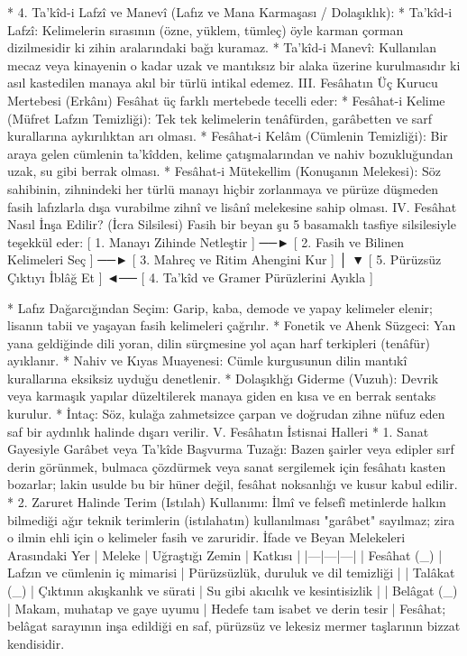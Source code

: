 \documentclass[11pt,a4paper]{article}
\begin{document}
 * 4. Ta'kîd-i Lafzî ve Manevî (Lafız ve Mana Karmaşası / Dolaşıklık):
   * Ta'kîd-i Lafzî: Kelimelerin sırasının (özne, yüklem, tümleç) öyle karman çorman dizilmesidir ki zihin aralarındaki bağı kuramaz.
   * Ta'kîd-i Manevî: Kullanılan mecaz veya kinayenin o kadar uzak ve mantıksız bir alaka üzerine kurulmasıdır ki asıl kastedilen manaya akıl bir türlü intikal edemez.
III. Fesâhatın Üç Kurucu Mertebesi (Erkânı)
Fesâhat üç farklı mertebede tecelli eder:
 * Fesâhat-i Kelime (Müfret Lafzın Temizliği): Tek tek kelimelerin tenâfürden, garâbetten ve sarf kurallarına aykırılıktan arı olması.
 * Fesâhat-i Kelâm (Cümlenin Temizliği): Bir araya gelen cümlenin ta'kîdden, kelime çatışmalarından ve nahiv bozukluğundan uzak, su gibi berrak olması.
 * Fesâhat-i Mütekellim (Konuşanın Melekesi): Söz sahibinin, zihnindeki her türlü manayı hiçbir zorlanmaya ve pürüze düşmeden fasih lafızlarla dışa vurabilme zihnî ve lisânî melekesine sahip olması.
IV. Fesâhat Nasıl İnşa Edilir? (İcra Silsilesi)
Fasih bir beyan şu 5 basamaklı tasfiye silsilesiyle teşekkül eder:
[ 1. Manayı Zihinde Netleştir ] ──► [ 2. Fasih ve Bilinen Kelimeleri Seç ] ──► [ 3. Mahreç ve Ritim Ahengini Kur ]
                                                                                               │
                                                                                               ▼
[ 5. Pürüzsüz Çıktıyı İblâğ Et ] ◄── [ 4. Ta'kîd ve Gramer Pürüzlerini Ayıkla ]

 * Lafız Dağarcığından Seçim: Garip, kaba, demode ve yapay kelimeler elenir; lisanın tabii ve yaşayan fasih kelimeleri çağrılır.
 * Fonetik ve Ahenk Süzgeci: Yan yana geldiğinde dili yoran, dilin sürçmesine yol açan harf terkipleri (tenâfür) ayıklanır.
 * Nahiv ve Kıyas Muayenesi: Cümle kurgusunun dilin mantıkî kurallarına eksiksiz uyduğu denetlenir.
 * Dolaşıklığı Giderme (Vuzuh): Devrik veya karmaşık yapılar düzeltilerek manaya giden en kısa ve en berrak sentaks kurulur.
 * İntaç: Söz, kulağa zahmetsizce çarpan ve doğrudan zihne nüfuz eden saf bir aydınlık halinde dışarı verilir.
V. Fesâhatın İstisnai Halleri
 * 1. Sanat Gayesiyle Garâbet veya Ta'kîde Başvurma Tuzağı:
   Bazen şairler veya edipler sırf derin görünmek, bulmaca çözdürmek veya sanat sergilemek için fesâhatı kasten bozarlar; lakin usulde bu bir hüner değil, fesâhat noksanlığı ve kusur kabul edilir.
 * 2. Zaruret Halinde Terim (Istılah) Kullanımı:
   İlmî ve felsefî metinlerde halkın bilmediği ağır teknik terimlerin (istılahatın) kullanılması "garâbet" sayılmaz; zira o ilmin ehli için o kelimeler fasih ve zaruridir.
İfade ve Beyan Melekeleri Arasındaki Yer
| Meleke | Uğraştığı Zemin | Katkısı |
|---|---|---|
| Fesâhat (_{}) | Lafzın ve cümlenin iç mimarisi | Pürüzsüzlük, duruluk ve dil temizliği |
| Talâkat (_{}) | Çıktının akışkanlık ve sürati | Su gibi akıcılık ve kesintisizlik |
| Belâgat (_{}) | Makam, muhatap ve gaye uyumu | Hedefe tam isabet ve derin tesir |
Fesâhat; belâgat sarayının inşa edildiği en saf, pürüzsüz ve lekesiz mermer taşlarının bizzat kendisidir.
\end{document}
